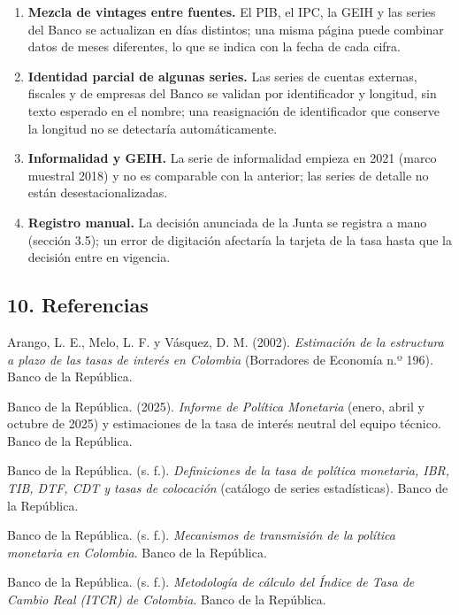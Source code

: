 \begin{enumerate}
  de la demanda no suman exactamente el total; el crecimiento ``sin
  Gobierno'' o ``sin minería'' es una aproximación con pesos corrientes.
\item
  \textbf{Mezcla de vintages entre fuentes.} El PIB, el IPC, la GEIH y
  las series del Banco se actualizan en días distintos; una misma página
  puede combinar datos de meses diferentes, lo que se indica con la
  fecha de cada cifra.
\item
  \textbf{Identidad parcial de algunas series.} Las series de cuentas
  externas, fiscales y de empresas del Banco se validan por
  identificador y longitud, sin texto esperado en el nombre; una
  reasignación de identificador que conserve la longitud no se
  detectaría automáticamente.
\item
  \textbf{Informalidad y GEIH.} La serie de informalidad empieza en 2021
  (marco muestral 2018) y no es comparable con la anterior; las series
  de detalle no están desestacionalizadas.
\item
  \textbf{Registro manual.} La decisión anunciada de la Junta se
  registra a mano (sección 3.5); un error de digitación afectaría la
  tarjeta de la tasa hasta que la decisión entre en vigencia.
\end{enumerate}

\hypertarget{referencias}{%
\subsection{10. Referencias}\label{referencias}}

Arango, L. E., Melo, L. F. y Vásquez, D. M. (2002). \emph{Estimación de
la estructura a plazo de las tasas de interés en Colombia} (Borradores
de Economía n.º 196). Banco de la República.

Banco de la República. (2025). \emph{Informe de Política Monetaria}
(enero, abril y octubre de 2025) y estimaciones de la tasa de interés
neutral del equipo técnico. Banco de la República.

Banco de la República. (s. f.). \emph{Definiciones de la tasa de
política monetaria, IBR, TIB, DTF, CDT y tasas de colocación} (catálogo
de series estadísticas). Banco de la República.

Banco de la República. (s. f.). \emph{Mecanismos de transmisión de la
política monetaria en Colombia}. Banco de la República.

Banco de la República. (s. f.). \emph{Metodología de cálculo del Índice
de Tasa de Cambio Real (ITCR) de Colombia}. Banco de la República.

